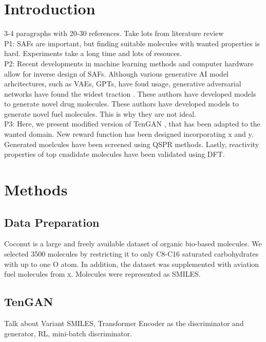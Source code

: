 \documentclass[journal=ENFL,manuscript=article]{achemso}
\begin{document}
\section{Introduction}
3-4 paragraphs with 20-30 references. Take lots from literature review\\
P1: SAFs are important, but finding suitable molecules with wanted properties is hard. Experiments take a long time and lots of resouces.  
\\
P2: Recent developments in machine learning methods and computer hardware allow for inverse design of SAFs. Although various generative AI model arhcitectures, such as VAEs, GPTs, have foud usage, generative adversarial networks have found the widest traction \cite{yalamanchi_generative_2025, li_tengan_2024, cao_molgan_2022, macedo_medgan_2024, liu_property-oriented_2025}. These authors have developed models to generate novel drug molecules. These authors have developed models to generate novel fuel molecules. This is why they are not ideal. 
\\
P3: Here, we present modified version of TenGAN \cite{li_tengan_2024}, that has been adapted to the wanted domain. New reward function has been designed incorporating x and y. Generated moelcules have been screened using QSPR methods. Lastly, reactivity properties of top cnadidate molecules have been validated using DFT. 


\section{Methods}


\subsection{Data Preparation}
Coconut is a large and freely available dataset of organic bio-based molecules. We selected 3500 molecules by restricting it to only C8-C16 saturated carbohydrates with up to one O atom. In addition, the dataset was supplemented with aviation fuel molecules from x. Molecules were represented as SMILES. 

\subsection{TenGAN}
Talk about Variant SMILES, Transformer Encoder as the discriminator and generator, RL, mini-batch discriminator. 
\end{document}

